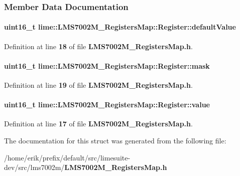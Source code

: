 \subsubsection{Member Data Documentation}
\paragraph[{default\+Value}]{\setlength{\rightskip}{0pt plus 5cm}uint16\+\_\+t lime\+::\+L\+M\+S7002\+M\+\_\+\+Registers\+Map\+::\+Register\+::default\+Value}\label{structlime_1_1LMS7002M__RegistersMap_1_1Register_a7060812b913e3d3fbee2de9fbb64d171}


Definition at line {\bf 18} of file {\bf L\+M\+S7002\+M\+\_\+\+Registers\+Map.\+h}.

\paragraph[{mask}]{\setlength{\rightskip}{0pt plus 5cm}uint16\+\_\+t lime\+::\+L\+M\+S7002\+M\+\_\+\+Registers\+Map\+::\+Register\+::mask}\label{structlime_1_1LMS7002M__RegistersMap_1_1Register_ad15b1d2df7f7a46adc64f1b3d89f30f2}


Definition at line {\bf 19} of file {\bf L\+M\+S7002\+M\+\_\+\+Registers\+Map.\+h}.

\paragraph[{value}]{\setlength{\rightskip}{0pt plus 5cm}uint16\+\_\+t lime\+::\+L\+M\+S7002\+M\+\_\+\+Registers\+Map\+::\+Register\+::value}\label{structlime_1_1LMS7002M__RegistersMap_1_1Register_aafa3db26043ec36dea2f18e948419a0b}


Definition at line {\bf 17} of file {\bf L\+M\+S7002\+M\+\_\+\+Registers\+Map.\+h}.



The documentation for this struct was generated from the following file\+:\begin{DoxyCompactItemize}
\item 
/home/erik/prefix/default/src/limesuite-\/dev/src/lms7002m/{\bf L\+M\+S7002\+M\+\_\+\+Registers\+Map.\+h}\end{DoxyCompactItemize}
